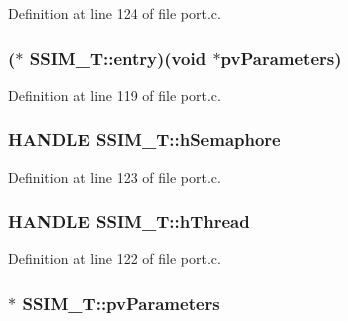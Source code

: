 Definition at line 124 of file port.\-c.

\hypertarget{struct_s_s_i_m___t_a53042065d3c3ce9a5c6578c26f489e5c}{
\subsubsection[{entry}]{($\ast$ S\-S\-I\-M\-\_\-\-T\-::entry)({\bf void} $\ast${\bf pv\-Parameters})}}\label{struct_s_s_i_m___t_a53042065d3c3ce9a5c6578c26f489e5c}


Definition at line 119 of file port.\-c.

\hypertarget{struct_s_s_i_m___t_a09cc61d8abc88e8e4f0f07c5b3d4092f}{
\subsubsection[{h\-Semaphore}]{\setlength{\rightskip}{0pt plus 5cm}H\-A\-N\-D\-L\-E S\-S\-I\-M\-\_\-\-T\-::h\-Semaphore}}\label{struct_s_s_i_m___t_a09cc61d8abc88e8e4f0f07c5b3d4092f}


Definition at line 123 of file port.\-c.

\hypertarget{struct_s_s_i_m___t_a26a83dec0b9880466e5fcd8bc3f1757e}{
\subsubsection[{h\-Thread}]{\setlength{\rightskip}{0pt plus 5cm}H\-A\-N\-D\-L\-E S\-S\-I\-M\-\_\-\-T\-::h\-Thread}}\label{struct_s_s_i_m___t_a26a83dec0b9880466e5fcd8bc3f1757e}


Definition at line 122 of file port.\-c.

\hypertarget{struct_s_s_i_m___t_a729718329892b37a37975fee9b3df407}{
\subsubsection[{pv\-Parameters}]{$\ast$ S\-S\-I\-M\-\_\-\-T\-::pv\-Parameters}}\label{struct_s_s_i_m___t_a729718329892b37a37975fee9b3df407}



